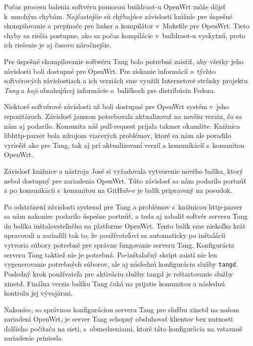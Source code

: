 Počas procesu balenia softvéru pomocou buildroot-u OpenWrt môže dôjsť k~mnohým chybám.
Najčastejšie sú chýbajúce závislosti knižníc pre úspešné skompilovanie a prepínače pre linker a kompilátor v~Makefile pre OpenWrt.
Tieto chyby sa riešia postupne, ako sa počas kompilácie v~buildroot-u vyskytnú, preto ich riešenie je aj časovo náročnejšie.

Pre úspešné skompilovanie softwéru Tang bolo potrebné zaistiť, aby všetky jeho závislosti boli dostupné pre OpenWrt.
Pre získanie informácií o~týchto softvérových závislostiach a ich verziách sme využili Internetové stránky projektu {\it Tang} a {\it koji} obsahujúcej informácie o~balíčkoch pre distribúciu Fedora.

Niektoré softvérové závislosti už boli dostupné pre OpenWrt systém v~jeho repozitároch.
Závislosť jansson potrebovala aktualizovať na novšiu verziu, čo sa nám aj podarilo.
Komunita náš pull-request prijala takmer okamžite.
Knižnica libhttp-parser bola zdrojom viacerých problémov, ktoré sa nám ale poradilo vyriešiť ako pre Tang, tak aj pri aktualizovaní verzií a komunikácií s~komunitou OpenWrt.

Závislosť knižnice a nástroja José si vyžadovala vytvorenie nového balíka, ktorý nebol dostupný pre zariadenia OpenWrt.
Túto závislosť sa nám podarilo portnúť a po komunikácii s~komunitou na GitHub-e je balík pripravený na posudok.

Po odstránení závislosti systemd pre Tang a problémov s~knižnicou http-parser sa nám nakoniec podarilo úspešne portnúť, a teda aj zabaliť softvér serveru Tang do balíka in\-šta\-lovateľného na platforme OpenWrt.
Tento balík sme niekoľko krát upravovali a zariadili tak to, že používateľovi sa automaticky po inštalácii vytvoria súbory potrebné pre správne fungovanie serveru Tang.
Konfigurácia serveru Tang taktiež nie je potrebná.
Po-inštalačný skript zaistí nie len vygenerovanie potrebných súborov, ale aj následnú konfiguráciu služby {\tt tangd}.
Posledný krok používateľa pre aktiváciu služby tangd je reštartovanie služby xinetd.
Finálna verzia balíku Tang čaká na prijatie komunitou a následnú kontrolu jej vývojármi.

Nakoniec, so správnou konfiguráciou serveru Tang pre službu xinetd na našom zariadení OpenWrt, je server Tang schopný obsluhovať klientov bez nutnosti ďalšieho počítača na sieti, s~obmedzeniami, ktoré táto konfigurácia na vstavané zariadenie priniesla.
